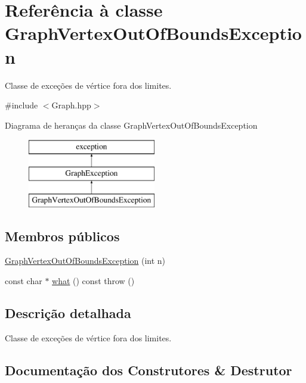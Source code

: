 \hypertarget{classGraphVertexOutOfBoundsException}{}\section{Referência à classe Graph\+Vertex\+Out\+Of\+Bounds\+Exception}
\label{classGraphVertexOutOfBoundsException}


Classe de exceções de vértice fora dos limites.  




{\ttfamily \#include $<$Graph.\+hpp$>$}

Diagrama de heranças da classe Graph\+Vertex\+Out\+Of\+Bounds\+Exception\begin{figure}[H]
\begin{center}
\leavevmode
\includegraphics[height=3.000000cm]{classGraphVertexOutOfBoundsException}
\end{center}
\end{figure}
\subsection*{Membros públicos}
\begin{DoxyCompactItemize}
\item 
\hyperlink{classGraphVertexOutOfBoundsException_a6f72cde302ff14c75138a7d1043d43e0}{Graph\+Vertex\+Out\+Of\+Bounds\+Exception} (int n)
\item 
const char $\ast$ \hyperlink{classGraphVertexOutOfBoundsException_ac85fc95ea1c178023571adf7a9b8b0df}{what} () const  throw ()
\end{DoxyCompactItemize}


\subsection{Descrição detalhada}
Classe de exceções de vértice fora dos limites. 

\subsection{Documentação dos Construtores \& Destrutor}
\mbox{\label{classGraphVertexOutOfBoundsException_a6f72cde302ff14c75138a7d1043d43e0}} 
